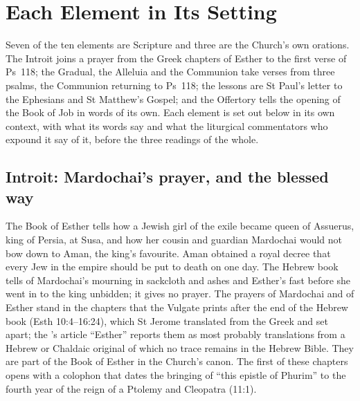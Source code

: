 \section{Each Element in Its Setting}
\label{sec:each-element}

Seven of the ten elements are Scripture and three are the Church's own orations.
The Introit joins a prayer from the Greek chapters of Esther to the first verse
of Ps~118; the Gradual, the Alleluia and the Communion take verses from three
psalms, the Communion returning to Ps~118; the lessons are St Paul's letter to
the Ephesians and St Matthew's Gospel; and the Offertory tells the opening of
the Book of Job in words of its own. Each element is set out below in its own
context, with what its words say and what the liturgical commentators who
expound it say of it, before the three readings of the whole.

\subsection{Introit: Mardochai's prayer, and the blessed way}

The Book of Esther tells how a Jewish girl of the exile became queen of
Assuerus, king of Persia, at Susa, and how her cousin and guardian Mardochai
would not bow down to Aman, the king's favourite. Aman obtained a royal decree
that every Jew in the empire should be put to death on one day. The Hebrew book
tells of Mardochai's mourning in sackcloth and ashes and Esther's fast before
she went in to the king unbidden; it gives no prayer. The prayers of Mardochai
and of Esther stand in the chapters that the Vulgate prints after the end of the
Hebrew book (Esth 10:4--16:24), which St Jerome translated from the Greek and
set apart; the 's article ``Esther'' reports them as
most probably translations from a Hebrew or Chaldaic original of which no trace
remains in the Hebrew Bible. They are part of the Book of Esther in the Church's
canon. The first of these chapters opens with a colophon that dates the bringing
of ``this epistle of Phurim'' to the fourth year of the reign of a Ptolemy and
Cleopatra (11:1).

